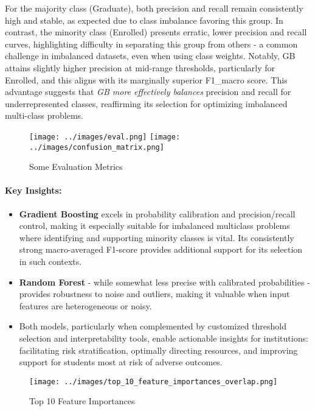 \documentclass[twoside,final]{hcmut-report}
\begin{document}
For the majority class (Graduate), both precision and recall remain consistently high and stable, as expected due to class imbalance favoring this group. In contrast, the minority class (Enrolled) presents erratic, lower precision and recall curves, highlighting difficulty in separating this group from others - a common challenge in imbalanced datasets, even when using class weights. Notably, GB attains slightly higher precision at mid-range thresholds, particularly for Enrolled, and this aligns with its marginally superior F1\_macro score. This advantage suggests that \textit{GB more effectively balances} precision and recall for underrepresented classes, reaffirming its selection for optimizing imbalanced multi-class problems.
\begin{figure}[H]
  \centering
  \texttt{[image: ../images/eval.png]}
  \texttt{[image: ../images/confusion\_matrix.png]}
  \caption{Some Evaluation Metrics}
  \label{eval_metrics}
\end{figure}
\paragraph*{Key Insights:}
\begin{itemize}
  \item \textbf{Gradient Boosting} excels in probability calibration and precision/recall control, making it especially suitable for imbalanced multiclass problems where identifying and supporting minority classes is vital. Its consistently strong macro-averaged F1-score provides additional support for its selection in such contexts.
  \item \textbf{Random Forest} - while somewhat less precise with calibrated probabilities - provides robustness to noise and outliers, making it valuable when input features are heterogeneous or noisy.
  \item Both models, particularly when complemented by customized threshold selection and interpretability tools, enable actionable insights for institutions: facilitating risk stratification, optimally directing resources, and improving support for students most at risk of adverse outcomes.
\end{itemize}
\begin{figure}[H]
  \centering
  \texttt{[image: ../images/top\_10\_feature\_importances\_overlap.png]}
  \caption{Top 10 Feature Importances}
  \label{top10_features}
\end{figure}
\end{document}
